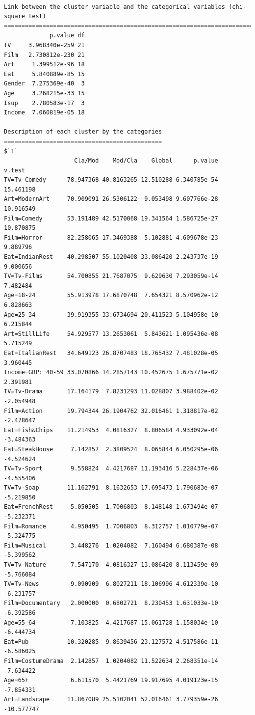 \documentclass[
  letterpaper,
  DIV=11,
  numbers=noendperiod]{scrartcl}
\begin{document}
\begin{verbatim}

Link between the cluster variable and the categorical variables (chi-square test)
=================================================================================
             p.value df
TV     3.968340e-259 21
Film   2.730812e-230 21
Art     1.399512e-96 18
Eat     5.840889e-85 15
Gender  7.275369e-40  3
Age     3.268215e-33 15
Isup    2.780583e-17  3
Income  7.060819e-05 18

Description of each cluster by the categories
=============================================
$`1`
                    Cla/Mod    Mod/Cla    Global      p.value     v.test
TV=Tv-Comedy      78.947368 40.8163265 12.510288 6.340785e-54  15.461198
Art=ModernArt     70.909091 26.5306122  9.053498 9.607766e-28  10.916549
Film=Comedy       53.191489 42.5170068 19.341564 1.586725e-27  10.870875
Film=Horror       82.258065 17.3469388  5.102881 4.609678e-23   9.889796
Eat=IndianRest    40.298507 55.1020408 33.086420 2.243737e-19   9.000656
TV=Tv-Films       54.700855 21.7687075  9.629630 7.293059e-14   7.482484
Age=18-24         55.913978 17.6870748  7.654321 8.570962e-12   6.828663
Age=25-34         39.919355 33.6734694 20.411523 5.104958e-10   6.215844
Art=StillLife     54.929577 13.2653061  5.843621 1.095436e-08   5.715249
Eat=ItalianRest   34.649123 26.8707483 18.765432 7.481028e-05   3.960445
Income=GBP: 40-59 33.070866 14.2857143 10.452675 1.675771e-02   2.391981
TV=Tv-Drama       17.164179  7.8231293 11.028807 3.988402e-02  -2.054948
Film=Action       19.794344 26.1904762 32.016461 1.318817e-02  -2.478647
Eat=Fish&Chips    11.214953  4.0816327  8.806584 4.933092e-04  -3.484363
Eat=SteakHouse     7.142857  2.3809524  8.065844 6.050295e-06  -4.524624
TV=Tv-Sport        9.558824  4.4217687 11.193416 5.228437e-06  -4.555406
TV=Tv-Soap        11.162791  8.1632653 17.695473 1.790683e-07  -5.219850
Eat=FrenchRest     5.050505  1.7006803  8.148148 1.673494e-07  -5.232371
Film=Romance       4.950495  1.7006803  8.312757 1.010779e-07  -5.324775
Film=Musical       3.448276  1.0204082  7.160494 6.680387e-08  -5.399562
TV=Tv-Nature       7.547170  4.0816327 13.086420 8.113459e-09  -5.766084
TV=Tv-News         9.090909  6.8027211 18.106996 4.612339e-10  -6.231757
Film=Documentary   2.000000  0.6802721  8.230453 1.631033e-10  -6.392586
Age=55-64          7.103825  4.4217687 15.061728 1.158034e-10  -6.444734
Eat=Pub           10.320285  9.8639456 23.127572 4.517586e-11  -6.586025
Film=CostumeDrama  2.142857  1.0204082 11.522634 2.268351e-14  -7.634422
Age=65+            6.611570  5.4421769 19.917695 4.019123e-15  -7.854331
Art=Landscape     11.867089 25.5102041 52.016461 3.779359e-26 -10.577747


\end{verbatim}
\end{document}
